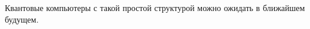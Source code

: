 
Квантовые компьютеры с такой простой структурой можно ожидать в ближайшем будущем.









\showbib


 
